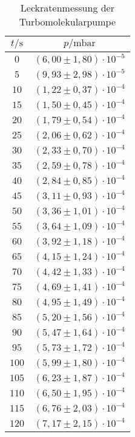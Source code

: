 \begin{table}[H]
  \centering
  \caption{Leckratenmessung der Turbomolekularpumpe}
  \label{tab:turboleck}
  \begin{tabular}{c c}
    \toprule
    $t/\si{\second}$ & $p/\si{\milli\bar}$ \\
    \midrule
    $  0$ & $(6,00 \pm 1,80) \cdot 10^{-5}$ \\
    $  5$ & $(9,93 \pm 2,98) \cdot 10^{-5}$ \\
    $ 10$ & $(1,22 \pm 0,37) \cdot 10^{-4}$ \\
    $ 15$ & $(1,50 \pm 0,45) \cdot 10^{-4}$ \\
    $ 20$ & $(1,79 \pm 0,54) \cdot 10^{-4}$ \\
    $ 25$ & $(2,06 \pm 0,62) \cdot 10^{-4}$ \\
    $ 30$ & $(2,33 \pm 0,70) \cdot 10^{-4}$ \\
    $ 35$ & $(2,59 \pm 0,78) \cdot 10^{-4}$ \\
    $ 40$ & $(2,84 \pm 0,85) \cdot 10^{-4}$ \\
    $ 45$ & $(3,11 \pm 0,93) \cdot 10^{-4}$ \\
    $ 50$ & $(3,36 \pm 1,01) \cdot 10^{-4}$ \\
    $ 55$ & $(3,64 \pm 1,09) \cdot 10^{-4}$ \\
    $ 60$ & $(3,92 \pm 1,18) \cdot 10^{-4}$ \\
    $ 65$ & $(4,15 \pm 1,24) \cdot 10^{-4}$ \\
    $ 70$ & $(4,42 \pm 1,33) \cdot 10^{-4}$ \\
    $ 75$ & $(4,69 \pm 1,41) \cdot 10^{-4}$ \\
    $ 80$ & $(4,95 \pm 1,49) \cdot 10^{-4}$ \\
    $ 85$ & $(5,20 \pm 1,56) \cdot 10^{-4}$ \\
    $ 90$ & $(5,47 \pm 1,64) \cdot 10^{-4}$ \\
    $ 95$ & $(5,73 \pm 1,72) \cdot 10^{-4}$ \\
    $100$ & $(5,99 \pm 1,80) \cdot 10^{-4}$ \\
    $105$ & $(6,23 \pm 1,87) \cdot 10^{-4}$ \\
    $110$ & $(6,50 \pm 1,95) \cdot 10^{-4}$ \\
    $115$ & $(6,76 \pm 2,03) \cdot 10^{-4}$ \\
    $120$ & $(7,17 \pm 2,15) \cdot 10^{-4}$ \\
    \bottomrule
  \end{tabular}
\end{table}

